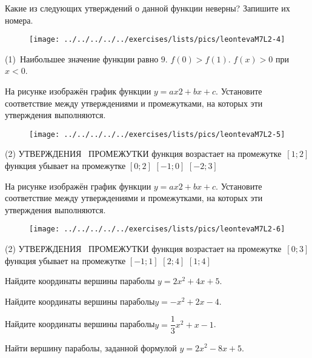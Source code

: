 \begin{class}[number=2]
\begin{listofex}
		Какие из следующих утверждений о данной функции неверны? Запишите их номера.
		\begin{figure}[h!]
			\centering
			\texttt{[image: ../../../../../exercises/lists/pics/leontevaM7L2-4]}
		\end{figure}
		\begin{tasks}(1)
			\task  Наибольшее значение функции равно \( 9 \).
			\task \( f(0)>f(1) \).
			\task \( f( x )>0 \) при \( x<0 \).
		\end{tasks}
		\newpage
		\item На рисунке изображён график функции \(  y = ax2 + bx + c \). Установите соответствие между утверждениями и промежутками, на которых эти утверждения выполняются. 
		\begin{figure}[h!]
			\centering
			\texttt{[image: ../../../../../exercises/lists/pics/leontevaM7L2-5]}
		\end{figure}
		\begin{tasks}(2)
			\task[] УТВЕРЖДЕНИЯ	 
			\task[]	ПРОМЕЖУТКИ
			\task[A)] функция возрастает на промежутке
			\task \( [1;2] \)
			\task[B)]функция убывает на промежутке
			\task \( [0;2] \)
			\task[]
			\task\( [-1;0] \)
			\task[]
			\task\( [-2;3] \)
		\end{tasks}
		\item 
		На рисунке изображён график функции \(  y = ax2 + bx + c \). Установите соответствие между утверждениями и промежутками, на которых эти утверждения выполняются. 
		\begin{figure}[h!]
			\centering
			\texttt{[image: ../../../../../exercises/lists/pics/leontevaM7L2-6]}
		\end{figure}
		\begin{tasks}(2)
			\task[] УТВЕРЖДЕНИЯ	 
			\task[]	ПРОМЕЖУТКИ
			\task[A)] функция возрастает на промежутке
			\task \( [0; 3] \)
			\task[B)]функция убывает на промежутке
			\task \( [-1; 1] \)
			\task[]
			\task\( [2; 4] \)
			\task[]
			\task\( [1; 4] \)
		\end{tasks}
		\item Найдите координаты вершины параболы \( y = 2x^{2} + 4x + 5 \).
		\item Найдите координаты вершины параболы\(  y = -x^{2} + 2x - 4 \).
		\item Найдите координаты вершины параболы\(  y = \dfrac{1}{3}x^{2}+x-1 \).
		\item Найти вершину параболы, заданной формулой \( y=2x^{2} - 8x + 5. \)
	\end{listofex}
\end{class}

